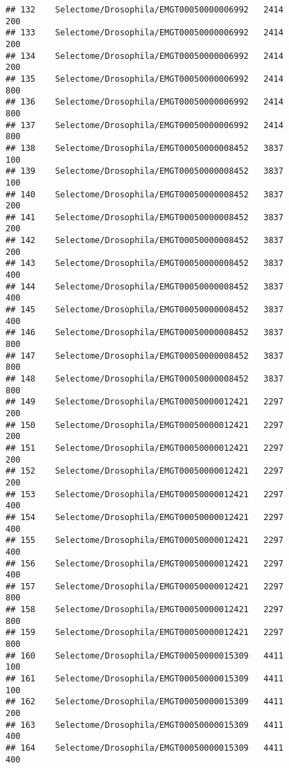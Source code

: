 \documentclass[
]{article}
\begin{document}
\begin{verbatim}
## 132    Selectome/Drosophila/EMGT00050000006992   2414                   200
## 133    Selectome/Drosophila/EMGT00050000006992   2414                   200
## 134    Selectome/Drosophila/EMGT00050000006992   2414                   200
## 135    Selectome/Drosophila/EMGT00050000006992   2414                   800
## 136    Selectome/Drosophila/EMGT00050000006992   2414                   800
## 137    Selectome/Drosophila/EMGT00050000006992   2414                   800
## 138    Selectome/Drosophila/EMGT00050000008452   3837                   100
## 139    Selectome/Drosophila/EMGT00050000008452   3837                   100
## 140    Selectome/Drosophila/EMGT00050000008452   3837                   200
## 141    Selectome/Drosophila/EMGT00050000008452   3837                   200
## 142    Selectome/Drosophila/EMGT00050000008452   3837                   200
## 143    Selectome/Drosophila/EMGT00050000008452   3837                   400
## 144    Selectome/Drosophila/EMGT00050000008452   3837                   400
## 145    Selectome/Drosophila/EMGT00050000008452   3837                   400
## 146    Selectome/Drosophila/EMGT00050000008452   3837                   800
## 147    Selectome/Drosophila/EMGT00050000008452   3837                   800
## 148    Selectome/Drosophila/EMGT00050000008452   3837                   800
## 149    Selectome/Drosophila/EMGT00050000012421   2297                   200
## 150    Selectome/Drosophila/EMGT00050000012421   2297                   200
## 151    Selectome/Drosophila/EMGT00050000012421   2297                   200
## 152    Selectome/Drosophila/EMGT00050000012421   2297                   200
## 153    Selectome/Drosophila/EMGT00050000012421   2297                   400
## 154    Selectome/Drosophila/EMGT00050000012421   2297                   400
## 155    Selectome/Drosophila/EMGT00050000012421   2297                   400
## 156    Selectome/Drosophila/EMGT00050000012421   2297                   400
## 157    Selectome/Drosophila/EMGT00050000012421   2297                   800
## 158    Selectome/Drosophila/EMGT00050000012421   2297                   800
## 159    Selectome/Drosophila/EMGT00050000012421   2297                   800
## 160    Selectome/Drosophila/EMGT00050000015309   4411                   100
## 161    Selectome/Drosophila/EMGT00050000015309   4411                   100
## 162    Selectome/Drosophila/EMGT00050000015309   4411                   200
## 163    Selectome/Drosophila/EMGT00050000015309   4411                   400
## 164    Selectome/Drosophila/EMGT00050000015309   4411                   400

\end{verbatim}
\end{document}
